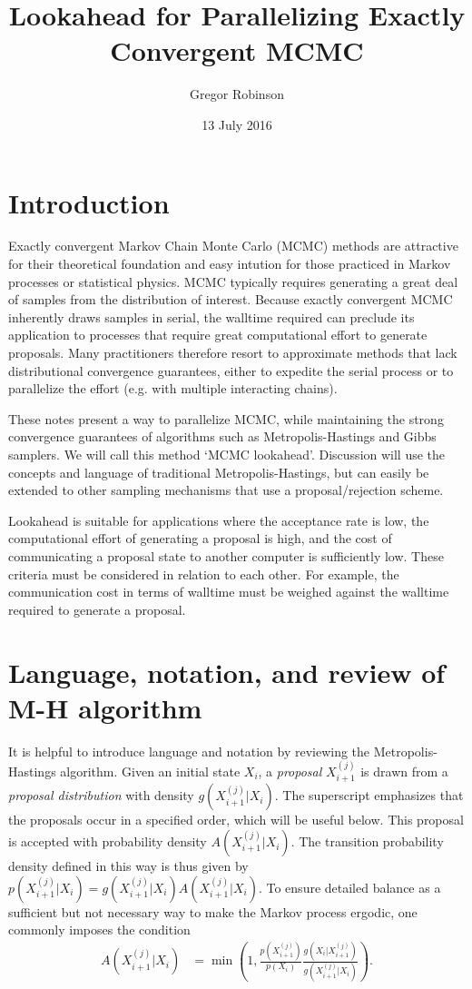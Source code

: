 \documentclass[10pt]{article}
\title{Lookahead for Parallelizing Exactly Convergent MCMC}
\author{Gregor Robinson}
\date{13 July 2016}
\begin{document}
\maketitle

\section{Introduction}
Exactly convergent Markov Chain Monte Carlo (MCMC) methods are attractive for their theoretical foundation and easy intution for those practiced in Markov processes or statistical physics.
MCMC typically requires generating a great deal of samples from the distribution of interest.
Because exactly convergent MCMC inherently draws samples in serial, the walltime required can preclude its application to processes that require great computational effort to generate proposals.
Many practitioners therefore resort to approximate methods that lack distributional convergence guarantees, either to expedite the serial process or to parallelize the effort (e.g. with multiple interacting chains).

These notes present a way to parallelize MCMC, while maintaining the strong convergence guarantees of algorithms such as Metropolis-Hastings and Gibbs samplers.
We will call this method `MCMC lookahead'.
Discussion will use the concepts and language of traditional Metropolis-Hastings, but can easily be extended to other sampling mechanisms that use a proposal/rejection scheme.

Lookahead is suitable for applications where the acceptance rate is low, the computational effort of generating a proposal is high, and the cost of communicating a proposal state to another computer is sufficiently low.
These criteria must be considered in relation to each other.
For example, the communication cost in terms of walltime must be weighed against the walltime required to generate a proposal.

\section{Language, notation, and review of M-H algorithm}
It is helpful to introduce language and notation by reviewing the Metropolis-Hastings algorithm.
Given an initial state $X_i$, a \emph{proposal} $X_{i+1}^{(j)}$ is drawn from a \emph{proposal distribution} with density $g(X_{i+1}^{(j)} | X_i)$.
The superscript emphasizes that the proposals occur in a specified order, which will be useful below.
This proposal is accepted with probability density $A(X_{i+1}^{(j)} | X_i)$.
The transition probability density defined in this way is thus given by $p(X_{i+1}^{(j)} | X_i) = g(X_{i+1}^{(j)} | X_i) A(X_{i+1}^{(j)} | X_i)$.
To ensure detailed balance as a sufficient but not necessary way to make the Markov process ergodic, one commonly imposes the condition
\begin{align*}
    A(X_{i+1}^{(j)} | X_i) &= \min \left( 1, \frac{p(X_{i+1}^{(j)})}{p(X_{i})} \frac{g(X_i | X_{i+1}^{(j)})}{g(X_{i+1}^{(j)} | X_i)} \right).
\end{align*}
\end{document}
